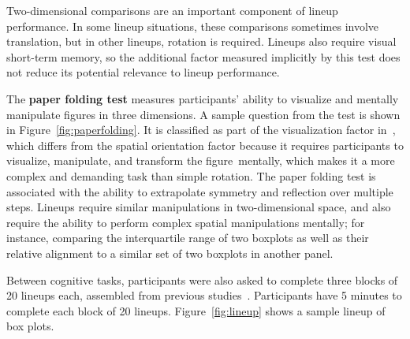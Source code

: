 \documentclass[11pt]{isuthesis}\usepackage[]{graphicx}\usepackage[]{color}
\begin{document}
 

Two-dimensional comparisons are an important component of lineup performance. In some lineup situations, these comparisons sometimes involve translation, but in other lineups, rotation is required. Lineups also require visual short-term memory, so the additional factor measured implicitly by this test does not reduce its potential relevance to lineup performance.  

The \textbf{paper folding test} measures participants' ability to visualize and mentally manipulate figures in three dimensions. A sample question from the test is shown in Figure~\ref{fig:paperfolding}. It is classified as part of the visualization factor in~\citep{ekstrom1976manual}, which differs from the spatial orientation factor because it requires participants to visualize, manipulate, and transform the figure~mentally, which makes it a more complex and demanding task than simple rotation. The paper folding test is associated with the ability to extrapolate symmetry and reflection over multiple steps.
Lineups require similar manipulations in two-dimensional space, and also require the ability to perform complex spatial manipulations mentally; for instance, comparing the interquartile range of two boxplots as well as their relative alignment to a similar set of two boxplots in another panel.

Between cognitive tasks, participants were also asked to complete three blocks of 20 lineups each, assembled from previous studies~\citep{hofmann2012graphical,majumder2013validation}. Participants have 5 minutes to complete each block of 20 lineups. Figure~\ref{fig:lineup} shows a sample lineup of box plots. 
\end{document}
